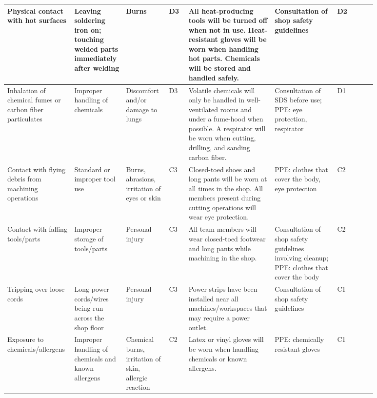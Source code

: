 \begin{footnotesize}
\begin{longtable}{|L{0.12\linewidth}|L{0.12\linewidth}|L{0.11\linewidth}|C{0.05\linewidth} |L{0.22\linewidth}|L{0.16\linewidth}|C{0.10\linewidth}|}
			\hline
			Physical contact with hot surfaces & Leaving soldering iron on; touching welded parts immediately after welding & Burns &  D3 & All heat-producing tools will be turned off when not in use. Heat-resistant gloves will be worn when handling hot parts. Chemicals will be stored and handled safely. & Consultation of shop safety guidelines
			&  D2 \\
			\hline
			Inhalation of chemical fumes or carbon fiber particulates & Improper handling of chemicals & Discomfort and/or damage to lungs &  D3 & Volatile chemicals will only be handled in well-ventilated rooms and under a fume-hood when possible. A respirator will be worn when cutting, drilling, and sanding carbon fiber. & Consultation of SDS before use; PPE: eye protection, respirator &  D1 \\
			\hline
			Contact with flying debris from machining operations & Standard or improper tool use & Burns, abrasions, irritation of eyes or skin &  C3 & Closed-toed shoes and long pants will be worn at all times in the shop. All members present during cutting operations will wear eye protection. & PPE: clothes that cover the body, eye protection &  C2 \\
			\hline
			Contact with falling tools/parts & Improper storage of tools/parts & Personal injury &  C3 & All team members will wear closed-toed footwear and long pants while machining in the shop. & Consultation of shop safety guidelines involving cleanup; PPE: clothes that cover the body &  C2 \\
			\hline
			Tripping over loose cords & Long power cords/wires being run across the shop floor & Personal injury &  C3 & Power strips have been installed near all machines/workspaces that may require a power outlet. & Consultation of shop safety guidelines
			&  C1 \\
			\hline
			Exposure to chemicals/allergens & Improper handling of chemicals and known allergens & Chemical burns, irritation of skin, allergic reaction &  C2 & Latex or vinyl gloves will be worn when handling chemicals or known allergens. & PPE: chemically resistant gloves &  C1 \\
			\hline
			

\end{longtable}
\end{footnotesize}
